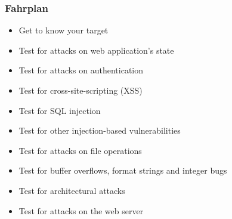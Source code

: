 \documentclass[aspectratio=169]{beamer}
\begin{document}



\begin{frame}
    \frametitle{Fahrplan}

    \begin{itemize}
        \item Get to know your target
        \item Test for attacks on web application's state
        \item Test for attacks on authentication
        \item Test for cross-site-scripting (XSS)
        \item Test for SQL injection
        \item Test for other injection-based vulnerabilities
        \item Test for attacks on file operations
        \item Test for buffer overflows, format strings and integer bugs
        \item Test for architectural attacks
        \item Test for attacks on the web server 
    \end{itemize}

\end{frame}

\end{document}
